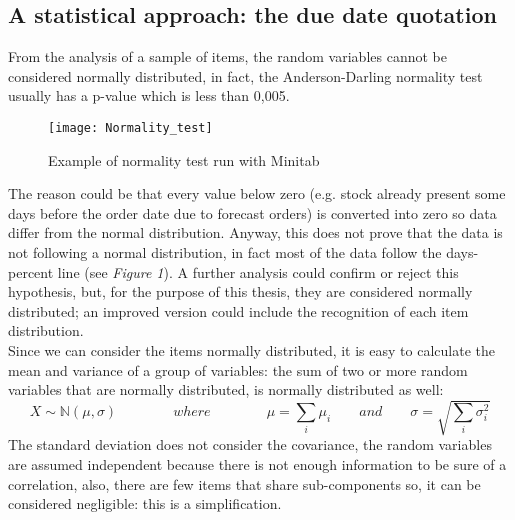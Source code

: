 \documentclass[a4paper,12pt]{article}
\begin{document}
\subsection{A statistical approach: the due date quotation}
From the analysis of a sample of items, the random variables cannot be considered normally distributed, in fact, the Anderson-Darling normality test usually has a p-value which is less than 0,005.\\
\begin{figure}[H]
	\begin{center}
		\texttt{[image: Normality\_test]}
		\caption{Example of normality test run with Minitab\textsuperscript{\textregistered}}
	\end{center}
\end{figure}
The reason could be that every value below zero (e.g. stock already present some days before the order date due to forecast orders) is converted into zero so data differ from the normal distribution. Anyway, this does not prove that the data is not following a normal distribution, in fact most of the data follow the days-percent line (see \textit{Figure 1}). A further analysis could confirm or reject this hypothesis, but, for the purpose of this thesis, they are considered normally distributed; an improved version could include the recognition of each item distribution.\\
Since we can consider the items normally distributed, it is easy to calculate the mean and variance of a group of variables: the sum of two or more random variables that are normally distributed, is normally distributed as well:
\begin{equation*}
X \sim \mathbb{N}(\mu, \sigma)		\qquad \qquad where \qquad \qquad		\mu = \sum_{i} \mu_{i} 		 \qquad and\qquad			\sigma = \sqrt{\sum_{i} \sigma_{i}^{2}}
\end{equation*}
The standard deviation does not consider the covariance, the random variables are assumed independent because there is not enough information to be sure of a correlation, also, there are few items that share sub-components so, it can be considered negligible: this is a simplification. \\
\end{document}
